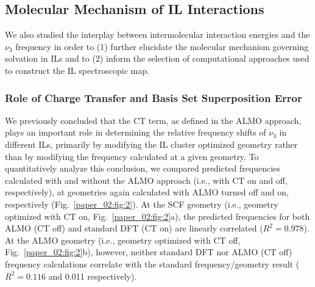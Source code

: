 \documentclass[%
  class = book,%
  crop = false,%
  float = true,%
  multi = true,%
  preview = false,%
]{standalone}
\let\cite\autocite
\newcommand{\cotil}{\ce{CO2}\textendash{}IL\xspace}%
\begin{document}
\subsection{\texorpdfstring{Molecular Mechanism of \cotil Interactions}{Molecular Mechanism of CO2-IL Interactions}}
\label{paper_02:ssec:IIIC}

We also studied the interplay between intermolecular interaction energies and the  \(\nu_{3}\) frequency in order to (1) further elucidate the molecular mechanism governing  solvation in ILs and to (2) inform the selection of computational approaches used to construct the \cotil spectroscopic map.\cite{Daly2016}

\subsubsection{Role of Charge Transfer and Basis Set Superposition Error}
\label{paper_02:sssec:IIIC1}

We previously concluded\cite{Brinzer2015} that the CT term, as defined in the ALMO approach, plays an important role in determining the relative frequency shifts of \(\nu_{3}\) in different ILs, primarily by modifying the \cotil cluster optimized geometry rather than by modifying the frequency calculated at a given geometry. To quantitatively analyze this conclusion, we compared predicted frequencies calculated with and without the ALMO approach (i.e., with CT on and off, respectively), at geometries again calculated with ALMO turned off and on, respectively (Fig.~\ref{paper_02:fig:2}). At the SCF geometry (i.e., geometry optimized with CT on, Fig.~\ref{paper_02:fig:2}a), the predicted frequencies for both ALMO (CT off) and standard DFT (CT on) are linearly correlated (\(R^2 = 0.978\)). At the ALMO geometry (i.e., geometry optimized with CT off, Fig.~\ref{paper_02:fig:2}b), however, neither standard DFT nor ALMO (CT off) frequency calculations correlate with the standard frequency/geometry result (\(R^2 = 0.116\) and \num{0.011} respectively).
\end{document}
